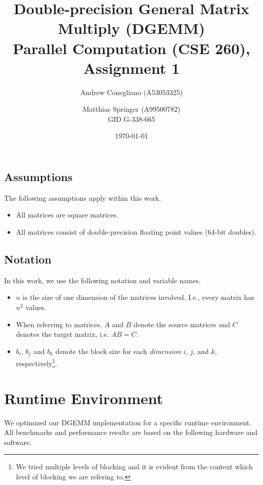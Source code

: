 \documentclass[12pt]{article}
\begin{document}
\title{Double-precision General Matrix Multiply (DGEMM)  \\ \vspace{2 mm} {\large Parallel Computation (CSE 260), Assignment 1}}
\date{\today}
\author{Andrew Conegliano (A53053325) \and Matthias Springer (A99500782) \\ GID G-338-665}
\maketitle

\subsection{Assumptions}
The following assumptions apply within this work.

\begin{itemize}
	\item All matrices are square matrices.
	\item All matrices consist of double-precision floating point values (64-bit doubles).
\end{itemize}

\subsection{Notation}
In this work, we use the following notation and variable names.
\begin{itemize}
	\item $n$ is the size of one dimension of the matrices involved. I.e., every matrix has $n^2$ values.
	\item When referring to matrices, $A$ and $B$ denote the source matrices and $C$ denotes the target matrix, i.e. $AB = C$.
	\item $b_i$, $b_j$ and $b_k$ denote the block size for each \emph{dimension} $i$, $j$, and $k$, respectively\footnote{We tried multiple levels of blocking and it is evident from the context which level of blocking we are refering to.}.
\end{itemize}

\section{Runtime Environment}
We optimized our DGEMM implementation for a specific runtime environment. All benchmarks and performance results are based on the following hardware and software.
\end{document}
